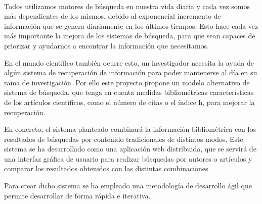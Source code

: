 \chapter*{}


%



\cleardoublepage
\thispagestyle{empty}

\begin{center}
{\large\bfseries \myTitle}\\
\end{center}
\begin{center}
\myName\\
\end{center}

\\

\vspace{0.7cm}
\\

Todos utilizamos motores de búsqueda en nuestra vida diaria y cada vez somos más dependientes de los mismos, debido al exponencial incremento de información que se genera diariamente en los últimos tiempos. Esto hace cada vez más importante la mejora de los sistemas de búsqueda, para que sean capaces de priorizar y ayudarnos a encontrar la información que necesitamos.

En el mundo científico también ocurre esto, un investigador necesita la ayuda de algún sistema de recuperación de información para poder mantenerse al día en su rama de investigación. Por ello este proyecto propone un modelo alternativo de sistema de búsqueda, que tenga en cuenta medidas bibliométricas características de los artículos científicos, como el número de citas o el índice h, para mejorar la recuperación.

En concreto, el sistema planteado combinará la información bibliométrica con los resultados de búsquedas por contenido tradicionales de distintos modos. Este sistema se ha desarrollado como una aplicación web distribuida, que se servirá de una interfaz gráfica de usuario para realizar búsquedas por autores o artículos y comparar los resultados obtenidos con las distintas combinaciones.

Para crear dicho sistema se ha empleado una metodología de desarrollo ágil que permite desarrollar de forma rápida e iterativa.


